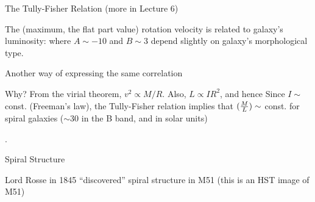 \documentclass[letterpaper,landscape]{slides}
\begin{document}
\begin{slide}
\begin{center}
{\large \color{red} 
           The Tully-Fisher Relation (more in Lecture 6)}
\end{center}

The (maximum, the flat part value) rotation velocity is related to  
galaxy's luminosity: 
where $A\sim-10$ and $B\sim3$ depend slightly on galaxy's
morphological type.

Another way of expressing the same correlation

{\color{red} Why?} From the virial theorem, $v^2 \propto M/R$.
Also, $L \propto I R^2$, and hence
Since $I\sim$const. (Freeman's law), the Tully-Fisher relation implies
that $({M \over L}) \sim$ const. for spiral galaxies ($\sim$30 in the B 
band, and in solar units) 

\vfill
\end{slide}




\begin{slide}
	.
	\begin{center}
		\vskip 2.5in
		{\large \color{red} 
			Spiral Structure}
	\end{center}
		
	\vfill
\end{slide}




\begin{slide}
\begin{center}
\vskip -0.1in
\end{center}

\begin{center}
\vskip -0.3in
Lord Rosse in 1845 ``discovered'' spiral structure in M51 (this is an HST image of M51)

\end{center}

\vfill
\end{slide}

\end{document}
